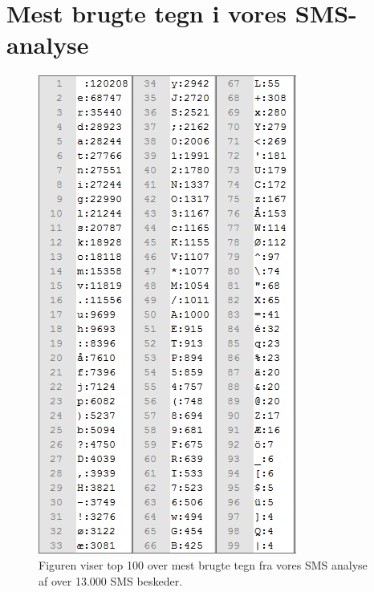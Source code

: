 \section{Mest brugte tegn i vores SMS-analyse}
\begin{figure}[H]
\centering
\includegraphics []{Billeder/SMSbilag.png}
\caption {Figuren viser top 100 over mest brugte tegn fra vores SMS analyse af over 13.000 SMS beskeder.}
\label {SMSanalyse}
\end{figure}

